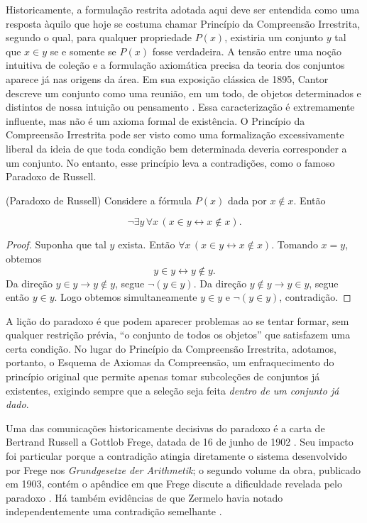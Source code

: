 Historicamente, a formulação restrita adotada aqui deve ser entendida como uma resposta àquilo que hoje se costuma chamar Princípio da Compreensão Irrestrita, segundo o qual, para qualquer propriedade $P(x)$, existiria um conjunto $y$ tal que $x \in y$ se e somente se $P(x)$ fosse verdadeira.
A tensão entre uma noção intuitiva de coleção e a formulação axiomática precisa da teoria dos conjuntos aparece já nas origens da área.
Em sua exposição clássica de 1895, Cantor descreve um conjunto como uma reunião, em um todo, de objetos determinados e distintos de nossa intuição ou pensamento \cite[p.~481]{cantor1895beitraege}.
Essa caracterização é extremamente influente, mas não é um axioma formal de existência.
O Princípio da Compreensão Irrestrita pode ser visto como uma formalização excessivamente liberal da ideia de que toda condição bem determinada deveria corresponder a um conjunto.
No entanto, esse princípio leva a contradições, como o famoso Paradoxo de Russell.

\begin{proposition}[$\BST$](Paradoxo de Russell)\label{prop:paradoxoDeRussell}
    Considere a fórmula $P(x)$ dada por $x \notin x$.
    Então
    
    \[
        \neg \exists y\, \forall x\, (x \in y \leftrightarrow x \notin x).
    \]
\end{proposition}
\begin{proof}
    Suponha que tal $y$ exista.
    Então $\forall x\, (x \in y \leftrightarrow x \notin x)$.
    Tomando $x=y$, obtemos
    \[
    y\in y \leftrightarrow y\notin y.
    \]
    Da direção $y\in y\to y\notin y$, segue $\neg(y\in y)$.
    Da direção $y\notin y\to y\in y$, segue então $y\in y$.
    Logo obtemos simultaneamente $y\in y$ e $\neg(y\in y)$, contradição.
\end{proof}

A lição do paradoxo é que podem aparecer problemas ao se tentar formar, sem qualquer restrição prévia, ``o conjunto de todos os objetos'' que satisfazem uma certa condição.
No lugar do Princípio da Compreensão Irrestrita, adotamos, portanto, o Esquema de Axiomas da Compreensão, um enfraquecimento do princípio original que permite apenas tomar subcoleções de conjuntos já existentes, exigindo sempre que a seleção seja feita \emph{dentro de um conjunto já dado}.

Uma das comunicações historicamente decisivas do paradoxo é a carta de Bertrand Russell a Gottlob Frege, datada de 16 de junho de 1902 \cite[p.~124--125]{russell1902letter}.
Seu impacto foi particular porque a contradição atingia diretamente o sistema desenvolvido por Frege nos \emph{Grundgesetze der Arithmetik}; o segundo volume da obra, publicado em 1903, contém o apêndice em que Frege discute a dificuldade revelada pelo paradoxo \cite{frege1903grundgesetze}.
Há também evidências de que Zermelo havia notado independentemente uma contradição semelhante \cite{rangThomas1981zermeloRussell}.


